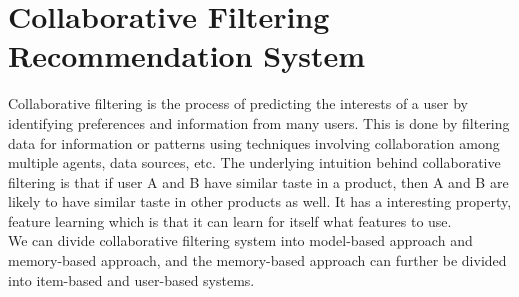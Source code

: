 \section{Collaborative Filtering Recommendation System}
Collaborative filtering is the process of predicting the interests of a user by identifying preferences and information from many users. 
This is done by filtering data for information or patterns using techniques involving collaboration among multiple agents, data sources, etc. 
The underlying intuition behind collaborative filtering is that if user A and B have similar taste in a product, then A and B are likely to have similar taste in other products as well.
It has a interesting property, feature learning which is that it can learn for itself what features to use. 
\\We can divide collaborative filtering system into model-based approach and memory-based approach, and the memory-based approach can 
further be divided into item-based and user-based systems.

